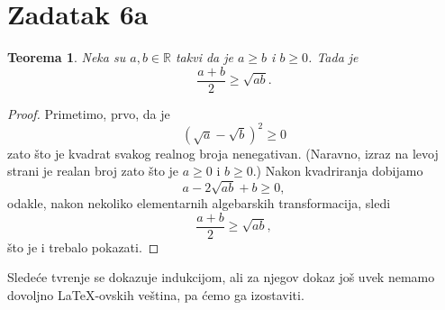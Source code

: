\documentclass[12pt, a4paper]{article}
\newtheorem*{theorem*}{Teorema}
\newcommand{\doubleint}{\mathop{\int\!\!\int}}
\begin{document}









    \section*{Zadatak 6a}


    \begin{theorem*}
        Neka su $a, b \in \mathbb{R}$ takvi da je $a \geq b$ i $b \geq 0$. Tada je
        \[
            \frac{a+b}{2} \geq \sqrt{ab}.
        \]
    \end{theorem*}

    \begin{proof}
        Primetimo, prvo, da je
        \[
            (\sqrt{a} - \sqrt{b})^2 \geq 0
        \]
        zato \v{s}to je kvadrat svakog realnog broja nenegativan. (Naravno, izraz na levoj strani
        je realan broj zato \v{s}to je $a \geq 0$ i $b \geq 0$.) Nakon kvadriranja dobijamo
        \[
            a - 2\sqrt{ab} + b \geq 0,
        \]
        odakle, nakon nekoliko elementarnih algebarskih transformacija, sledi
        \[
            \frac{a+b}{2} \geq \sqrt{ab},
        \]
        \v{s}to je i trebalo pokazati.
    \end{proof}

    Slede\'ce tvr\dj enje se dokazuje indukcijom, ali za njegov dokaz jo\v{s} uvek nemamo dovoljno
    \LaTeX-ovskih ve\v{s}tina, pa \'cemo ga izostaviti.
\end{document}
